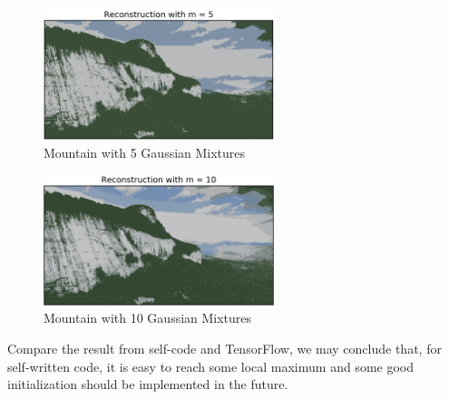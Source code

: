 \begin{figure}[H]
\centering
\includegraphics[width=0.6\textwidth]{./figures/self_tf_5.png}
\caption{\label{fig:self_tf_5} Mountain with 5 Gaussian Mixtures}
\end{figure}

\begin{figure}[H]
\centering
\includegraphics[width=0.6\textwidth]{./figures/self_tf_10.png}
\caption{\label{fig:self_tf_10} Mountain with 10 Gaussian Mixtures}
\end{figure}

\noindent Compare the result from self-code and TensorFlow, we may conclude that, for self-written code, it is easy to reach some local maximum and some good initialization should be implemented in the future.

\clearpage


